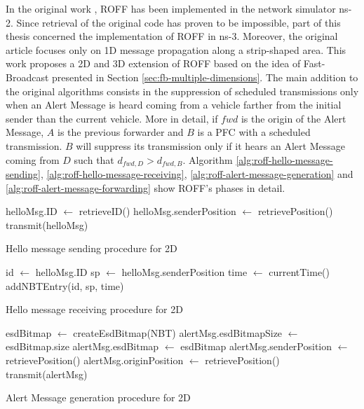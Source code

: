 		In the original work \cite{6906275}, ROFF has been implemented in the network simulator ns-2. Since retrieval of the original code has proven to be impossible, part of this thesis concerned the implementation of ROFF in ns-3. Moreover, the original article focuses only on 1D message propagation along a strip-shaped area. This work proposes a 2D and 3D extension of ROFF based on the idea of Fast-Broadcast presented in Section \ref{sec:fb-multiple-dimensions}. The main addition to the original algorithms consists in the suppression of scheduled transmissions only when an Alert Message is heard coming from a vehicle farther from the initial sender than the current vehicle. More in detail, if $fwd$ is the origin of the Alert Message, $A$ is the previous forwarder and $B$ is a PFC with a scheduled transmission. $B$ will suppress its transmission only if it hears an Alert Message coming from $D$ such that $d_{fwd, D} > d_{fwd, B}$.
		Algorithm \ref{alg:roff-hello-message-sending}, \ref{alg:roff-hello-message-receiving}, \ref{alg:roff-alert-message-generation} and \ref{alg:roff-alert-message-forwarding} show ROFF's phases in detail.
		
		\begin{algorithm}[H]
			\begin{algorithmic}[1]
				\State helloMsg.ID $\gets$ retrieveID()
				\State helloMsg.senderPosition $\gets$ retrievePosition()
				\State transmit(helloMsg)
				\EndFor
			\end{algorithmic}
			\caption{Hello message sending procedure for 2D}
			\label{alg:roff-hello-message-sending}
		\end{algorithm}
	
		\begin{algorithm}[H]
			\begin{algorithmic}[1]
				\State id $\gets$ helloMsg.ID
				\State sp $\gets$ helloMsg.senderPosition
				\State time $\gets$ currentTime()
				\State addNBTEntry(id, sp, time)
			\end{algorithmic}
			\caption{Hello message receiving procedure for 2D}
			\label{alg:roff-hello-message-receiving}
		\end{algorithm}
		
		\begin{algorithm}[H]
			\begin{algorithmic}[1]
				\State esdBitmap $\gets$ createEsdBitmap(NBT)
				\State alertMsg.esdBitmapSize $\gets$ esdBitmap.size
				\State alertMsg.esdBitmap $\gets$ esdBitmap
				\State alertMsg.senderPosition $\gets$ retrievePosition()
				\State alertMsg.originPosition $\gets$ retrievePosition()
				\State transmit(alertMsg)
			\end{algorithmic}
			\caption{Alert Message generation procedure for 2D}
			\label{alg:roff-alert-message-generation}
		\end{algorithm}
		
